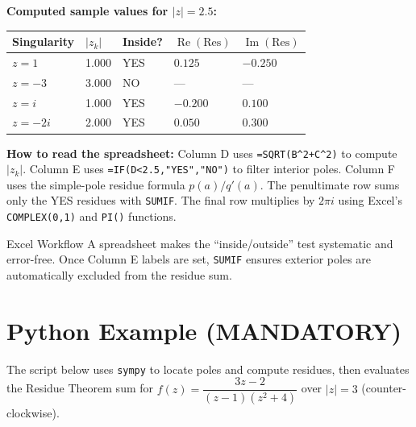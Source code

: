 \documentclass[12pt,a4paper]{article}
\begin{document}
\medskip
\textbf{Computed sample values for $|z|=2.5$:}

\begin{center}
\begin{tabular}{lllll}
\toprule
Singularity & $|z_k|$ & Inside? & $\operatorname{Re}(\text{Res})$ & $\operatorname{Im}(\text{Res})$ \\
\midrule
$z=1$    & 1.000 & YES & $0.125$ & $-0.250$ \\
$z=-3$   & 3.000 & NO  & ---     & ---      \\
$z=i$    & 1.000 & YES & $-0.200$ & $0.100$ \\
$z=-2i$  & 2.000 & YES & $0.050$ & $0.300$ \\
\bottomrule
\end{tabular}
\end{center}

\noindent
\textbf{How to read the spreadsheet:}
Column D uses \texttt{=SQRT(B\^{}2+C\^{}2)} to compute $|z_k|$.
Column E uses \texttt{=IF(D<2.5,"YES","NO")} to filter interior poles.
Column F uses the simple-pole residue formula $p(a)/q'(a)$.
The penultimate row sums only the YES residues with \texttt{SUMIF}.
The final row multiplies by $2\pi i$ using Excel's \texttt{COMPLEX(0,1)} and
\texttt{PI()} functions.

\begin{learnbox}{Excel Workflow}
A spreadsheet makes the ``inside/outside'' test systematic and error-free.
Once Column E labels are set, \texttt{SUMIF} ensures exterior poles are
automatically excluded from the residue sum.
\end{learnbox}

\section{Python Example (MANDATORY)}

The script below uses \texttt{sympy} to locate poles and compute residues,
then evaluates the Residue Theorem sum for
$f(z) = \dfrac{3z-2}{(z-1)(z^2+4)}$
over $|z|=3$ (counter-clockwise).
\end{document}

